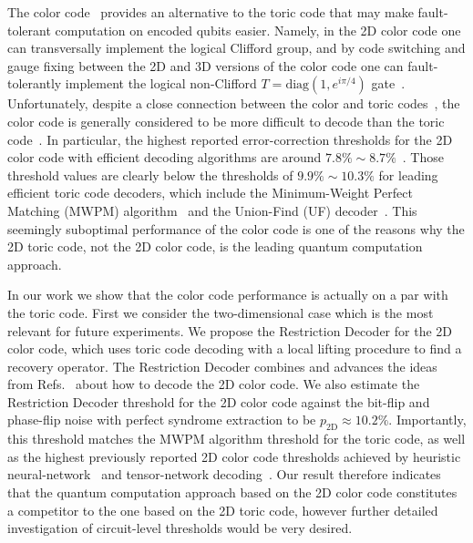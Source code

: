 \documentclass[onecolumn,letterpaper,11pt,accepted=2022-12-19]{quantumarticle}
\newcommand{\psqoct}{10.2\%}
\theoremstyle{definition}
\theoremstyle{lemma}
\theoremstyle{theorem}
\theoremstyle{corollary}
\begin{document}
The color code~\cite{Bombin2006,Bombin2007,Kubicathesis} provides an alternative to the toric code that may make fault-tolerant computation on encoded qubits easier.
Namely, in the 2D color code one can transversally implement the logical Clifford group, and by code switching and gauge fixing \cite{Paetznick2013, Anderson2014} between the 2D and 3D versions of the color code one can fault-tolerantly implement the logical non-Clifford $T = \textrm{diag}(1,e^{i \pi/4})$ gate~\cite{Bombin2016, Bombin2013, Kubica2015a,Beverland2021}.
Unfortunately, despite a close connection between the color and toric codes~\cite{Kubica2015}, the color code is generally considered to be more difficult to decode  than the toric code~\cite{Wang2010,Landahl2011}.
In particular, the highest reported error-correction thresholds for the 2D color code with efficient decoding algorithms are around $7.8\%\sim 8.7\%$~\cite{Sarvepalli2012,Bombin2012a, Delfosse2014}.
Those threshold values are clearly below the thresholds of $9.9\% \sim 10.3\%$ for leading efficient toric code decoders, which include the Minimum-Weight Perfect Matching (MWPM) algorithm~\cite{Dennis2002} and the Union-Find (UF) decoder~\cite{Delfosse2017}.
This seemingly suboptimal performance of the color code is one of the reasons why the 2D toric code, not the 2D color code, is the leading quantum computation approach.


In our work we show that the color code performance is actually on a par with the toric code.
First we consider the two-dimensional case which is the most relevant for future experiments.
We propose the Restriction Decoder for the 2D color code, which uses toric code decoding with a local lifting procedure to find a recovery operator.
The Restriction Decoder combines and advances the ideas from Refs.~\cite{Bombin2012a,Delfosse2014} about how to decode the 2D color code.
We also estimate the Restriction Decoder threshold for the 2D color code against the bit-flip and phase-flip noise with perfect syndrome extraction to be $p_{\textrm{2D}} \approx \psqoct$.
Importantly, this threshold matches the MWPM algorithm threshold for the toric code, as well as the highest previously reported 2D color code thresholds achieved by heuristic neural-network~\cite{Maskara2018} and tensor-network decoding~\cite{Tuckett2019}. 
Our result therefore indicates that the quantum computation approach based on the 2D color code constitutes a competitor to the one based on the 2D toric code, however further detailed investigation of circuit-level thresholds would be very desired.
\end{document}
